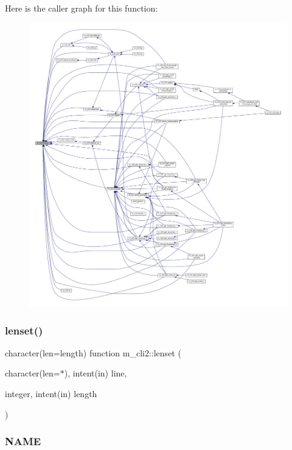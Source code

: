 Here is the caller graph for this function\+:
\nopagebreak
\begin{figure}[H]
\begin{center}
\leavevmode
\includegraphics[width=350pt]{namespacem__cli2_a4c12c311327951984c6e1611da23cdfd_icgraph}
\end{center}
\end{figure}
\mbox{\label{namespacem__cli2_ad13853611abfee00d40ffa020662ec8a}} 
\subsubsection{\texorpdfstring{lenset()}{lenset()}}
{\footnotesize\ttfamily character(len=length) function m\+\_\+cli2\+::lenset (\begin{DoxyParamCaption}\item[{character(len=$\ast$), intent(in)}]{line,  }\item[{integer, intent(in)}]{length }\end{DoxyParamCaption})\hspace{0.3cm}{\ttfamily [private]}}



\subsubsection*{N\+A\+ME}

